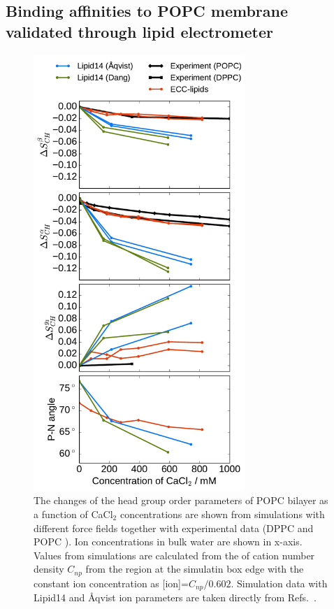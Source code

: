 \documentclass[aip,jcp,twocolumn]{revtex4}
\begin{document}
\subsection{Binding affinities to POPC membrane validated through lipid electrometer}

\begin{figure}[tbp]
  \centering
  \includegraphics[width=8.0cm]{../Fig/ipython_nb/PN_angle_OrdPars-A-B-g3_L14-ECCL17_q80_sig89_CaCl.pdf}
  \caption{\label{fig:delta_ordPar_CaCl}
    The changes of the head group order parameters of POPC bilayer as a function of CaCl$_2$ concentrations
    are shown from simulations with different force fields together with experimental data 
    (DPPC \cite{akutsu81} and POPC \cite{altenbach84}). 
    Ion concentrations in bulk water are shown in x-axis. 
    Values from simulations are calculated from the of cation number density $C_{np}$
    from the region at the simulatin box edge with the constant ion concentration as [ion]=$C_{np}/0.602$.
    Simulation data with Lipid14 and \AA{}qvist ion parameters are taken directly from
    Refs.~\cite{lipid14POPC0mMNaClfiles,lipid14POPC350mMCaClfiles,lipid14POPC350mMCaClfilesNC}.
}
\end{figure}
\end{document}
